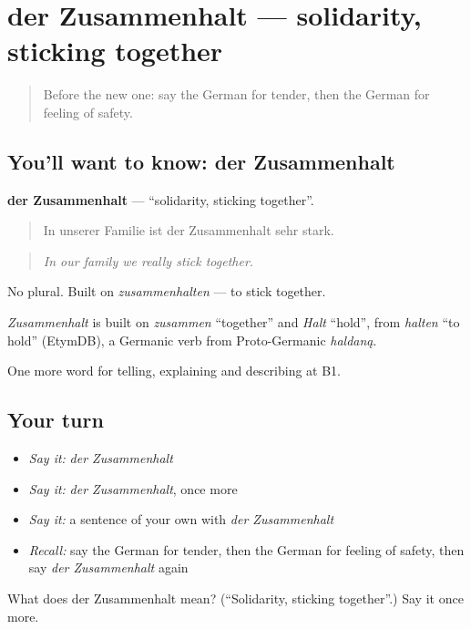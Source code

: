 \section[der Zusammenhalt]{der Zusammenhalt — solidarity, sticking together}

\label{lesson:GE-C493-zusammenhalt}



\begin{quote}
Before the new one: say the German for tender, then the German for feeling of safety.
\end{quote}

\subsection*{You'll want to know: der Zusammenhalt}
\textbf{der Zusammenhalt} — \textquotedblleft{}solidarity, sticking together\textquotedblright{}.

\begin{quote}
In unserer Familie ist der Zusammenhalt sehr stark.
\end{quote}

\begin{quote}
\emph{In our family we really stick together.}
\end{quote}

No plural. Built on \emph{zusammenhalten} — to stick together.

\begin{cousinweb}
\emph{Zusammenhalt} is built on \emph{zusammen} \textquotedblleft{}together\textquotedblright{} and \emph{Halt} \textquotedblleft{}hold\textquotedblright{}, from \emph{halten} \textquotedblleft{}to hold\textquotedblright{} (EtymDB), a Germanic verb from Proto-Germanic \emph{haldaną}.
\end{cousinweb}

\begin{grammarlens}[title={What you've built}]
One more word for telling, explaining and describing at B1.
\end{grammarlens}

\subsection*{Your turn}
\begin{itemize}
\raggedright
  \item \emph{Say it:} \emph{der Zusammenhalt}
  \item \emph{Say it:} \emph{der Zusammenhalt}, once more
  \item \emph{Say it:} a sentence of your own with \emph{der Zusammenhalt}
  \item \emph{Recall:} say the German for tender, then the German for feeling of safety, then say \emph{der Zusammenhalt} again
\end{itemize}

\begin{tcolorbox}[breakable,colback=teal!4,colframe=teal!35!black,title={Before you move on}]
What does der Zusammenhalt mean? (\textquotedblleft{}Solidarity, sticking together\textquotedblright{}.) Say it once more.
\end{tcolorbox}
